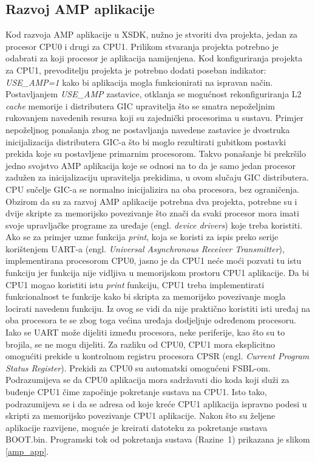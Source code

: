 \documentclass[times, utf8, diplomski, numeric]{fer}
\begin{document}
\subsection{Razvoj AMP aplikacije}
Kod razvoja AMP aplikacije u XSDK, nužno je stvoriti dva projekta, jedan za procesor CPU0 i drugi za CPU1.
Prilikom stvaranja projekta potrebno je odabrati za koji procesor je aplikacija namijenjena. Kod konfiguriranja
projekta za CPU1, prevoditelju projekta je potrebno dodati poseban indikator: \textit{USE\_AMP=1} kako bi aplikacija mogla
funkcionirati na ispravan način. Postavljanjem \textit{USE\_AMP} zastavice, otklanja se mogućnost rekonfiguriranja L2 \textit{cache}
memorije i distributera GIC upravitelja što se smatra nepoželjnim rukovanjem navedenih resursa koji su zajednički procesorima
u sustavu. Primjer nepoželjnog ponašanja zbog ne postavljanja navedene zastavice je dvostruka inicijalizacija distributera
GIC-a što bi moglo rezultirati gubitkom postavki prekida koje su postavljene primarnim procesorom. Takvo ponašanje bi
prekršilo jedno svojstvo AMP aplikacija koje se odnosi na to da je samo jedan procesor zadužen za inicijalizaciju upravitelja
prekidima, u ovom slučaju GIC distributera. CPU sučelje GIC-a se normalno inicijalizira na oba procesora, bez ograničenja.
Obzirom da su za razvoj AMP aplikacije potrebna dva projekta, potrebne su i dvije skripte za memorijsko povezivanje što
znači da svaki procesor mora imati svoje upravljačke programe za uređaje (engl. \textit{device drivers}) koje treba koristiti.
Ako se za primjer uzme funkcija \textit{print}, koja se koristi za ispis preko serije korištenjem UART-a (engl. \textit{Universal
Asynchronous Receiver Transmitter}), implementirana procesorom CPU0, jasno je da CPU1 neće moći pozvati tu istu funkciju
jer funkcija nije vidljiva u memorijskom prostoru CPU1 aplikacije. Da bi CPU1 mogao koristiti istu \textit{print} funkciju,
CPU1 treba implementirati funkcionalnost te funkcije kako bi skripta za memorijsko povezivanje mogla locirati navedenu
funkciju. Iz ovog se vidi da nije praktično koristiti isti uređaj na oba procesora te se zbog toga većina uređaja dodjeljuje
određenom procesoru. Iako se UART može dijeliti između procesora, neke periferije, kao što su to brojila, se ne mogu dijeliti.
Za razliku od CPU0, CPU1 mora eksplicitno omogućiti prekide u kontrolnom registru procesora CPSR (engl. \textit{Current
Program Status Register}). Prekidi za CPU0 su
automatski omogućeni FSBL-om. Podrazumijeva se da CPU0 aplikacija mora sadržavati dio koda koji služi za buđenje CPU1
čime započinje pokretanje sustava na CPU1. Isto tako, podrazumijeva se i da se adresa od koje kreće CPU1 aplikacija
ispravno podesi u skripti za memorijsko povezivanje CPU1 aplikacije. Nakon što su željene aplikacije razvijene, moguće
je kreirati datoteku za pokretanje sustava BOOT.bin. Programski tok od pokretanja sustava (Razine~1) prikazana je slikom
\ref{amp_app}.
\end{document}
